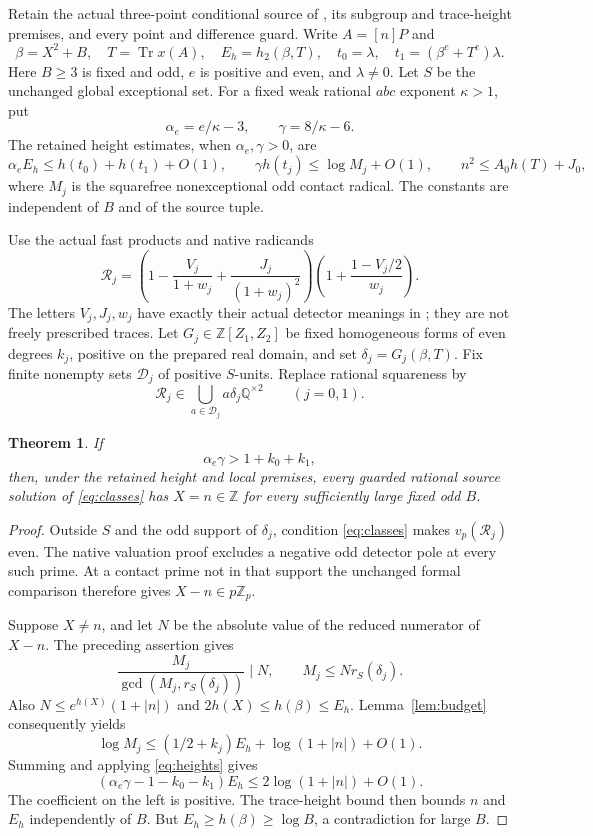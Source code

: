 \documentclass[11pt,a4paper]{article}
\newtheorem{theorem}{Theorem}[section]
\newcommand{\Q}{\mathbb Q}\newcommand{\Z}{\mathbb Z}
\DeclareMathOperator{\Tr}{Tr}
\begin{document}
Retain the actual three-point conditional source of
\cite{Conditional,Reweighted,Native}, its subgroup and trace-height
premises, and every point and difference guard. Write $A=[n]P$ and
\[
 \beta=X^2+B,\quad T=\Tr x(A),\quad E_h=h_2(\beta,T),\quad
 t_0=\lambda,\quad t_1=(\beta^e+T^e)\lambda.
\]
Here $B\ge3$ is fixed and odd, $e$ is positive and even, and
$\lambda\ne0$. Let $S$ be the unchanged global exceptional set.
For a fixed weak rational $abc$ exponent $\kappa>1$, put
\[
 \alpha_e=e/\kappa-3,\qquad \gamma=8/\kappa-6.
\]
The retained height estimates, when $\alpha_e,\gamma>0$, are
\begin{equation}\label{eq:heights}
 \alpha_e E_h\le h(t_0)+h(t_1)+O(1),\qquad
 \gamma h(t_j)\le\log M_j+O(1),\qquad
 n^2\le A_0h(T)+J_0,
\end{equation}
where $M_j$ is the squarefree nonexceptional odd contact radical.
The constants are independent of $B$ and of the source tuple.

Use the actual fast products and native radicands
\[
 \mathcal R_j=
 \left(1-\frac{V_j}{1+w_j}+\frac{J_j}{(1+w_j)^2}\right)
 \left(1+\frac{1-V_j/2}{w_j}\right).
\]
The letters $V_j,J_j,w_j$ have exactly their actual detector
meanings in \cite{Native}; they are not freely prescribed traces.
Let $G_j\in\Z[Z_1,Z_2]$ be fixed homogeneous forms of even degrees
$k_j$, positive on the prepared real domain, and set
$\delta_j=G_j(\beta,T)$. Fix finite nonempty sets $\mathcal D_j$
of positive $S$-units. Replace rational squareness by
\begin{equation}\label{eq:classes}
 \mathcal R_j\in\bigcup_{a\in\mathcal D_j}a\delta_j\Q^{\times2}
 \qquad(j=0,1).
\end{equation}

\begin{theorem}\label{thm:two}
If
\begin{equation}\label{eq:twoineq}
 \alpha_e\gamma>1+k_0+k_1,
\end{equation}
then, under the retained height and local premises, every guarded
rational source solution of \eqref{eq:classes} has $X=n\in\Z$
for every sufficiently large fixed odd $B$.
\end{theorem}
\begin{proof}
Outside $S$ and the odd support of $\delta_j$, condition
\eqref{eq:classes} makes $v_p(\mathcal R_j)$ even. The native
valuation proof excludes a negative odd detector pole at every
such prime. At a contact prime not in that support the unchanged
formal comparison therefore gives $X-n\in p\Z_p$.

Suppose $X\ne n$, and let $N$ be the absolute value of the reduced
numerator of $X-n$. The preceding assertion gives
\[
 \frac{M_j}{\gcd(M_j,r_S(\delta_j))}\mid N,
 \qquad M_j\le N r_S(\delta_j).
\]
Also $N\le e^{h(X)}(1+|n|)$ and $2h(X)\le h(\beta)\le E_h$.
Lemma~\ref{lem:budget} consequently yields
\[
 \log M_j\le(1/2+k_j)E_h+\log(1+|n|)+O(1).
\]
Summing and applying \eqref{eq:heights} gives
\[
 (\alpha_e\gamma-1-k_0-k_1)E_h
 \le2\log(1+|n|)+O(1).
\]
The coefficient on the left is positive. The trace-height bound
then bounds $n$ and $E_h$ independently of $B$. But
$E_h\ge h(\beta)\ge\log B$, a contradiction for large $B$.
\end{proof}
\end{document}

